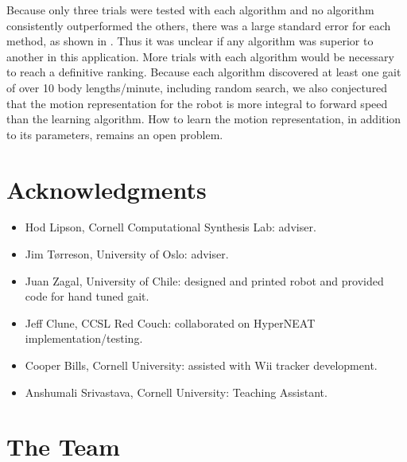 Because only three trials were tested with each algorithm and no
algorithm consistently outperformed the others, there was a large
standard error for each method, as shown in . Thus
it was unclear if any algorithm was superior to another in this
application. More trials with each algorithm would be necessary to
reach a definitive ranking. Because each algorithm discovered at least one gait of
over 10 body lengths/minute, including random search, we also
conjectured that the motion representation for the robot is more
integral to forward speed than the learning algorithm.  How to learn
the motion representation, in addition to its parameters, remains an
open problem.



\section{Acknowledgments}
\begin{itemize}
\item Hod Lipson, Cornell Computational Synthesis Lab: adviser.
\item Jim T\o rreson, University of Oslo: adviser.
\item Juan Zagal, University of Chile: designed and printed robot and provided code for hand tuned gait.
\item Jeff Clune, CCSL Red Couch: collaborated on HyperNEAT implementation/testing.
\item Cooper Bills, Cornell University: assisted with Wii tracker development.
\item Anshumali Srivastava, Cornell University: Teaching Assistant.
\end{itemize}

\section{The Team}

